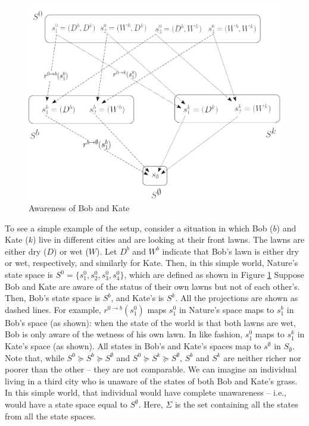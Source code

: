 \documentclass[
11pt,
titlepage,
reqno,
]{article}%
\theoremstyle{definition}
\begin{document}
	
\begin{figure}[h!]	
	\begin{center}
		\includegraphics[scale=.4]{lattice.png}
	\end{center}
\caption{Awareness of Bob and Kate\label{lattice}}
\end{figure}

	To see a simple example of the setup, consider a situation in which  Bob ($b$) and Kate ($k$) live in different cities and are looking at their front lawns. 
	The lawns are either dry ($D$) or wet ($W$).
	Let $D^b$ and $W^b$ indicate that Bob's lawn is either dry or wet, respectively, and similarly for Kate. 
	Then, in this simple world, Nature's state space is $S^0=\{s^0_1,s^0_2,s^0_3,s^0_4\}$, which are defined as shown in Figure \ref{lattice}
	Suppose Bob and Kate are aware of the status of their own lawns but not of each other's.
	Then, Bob's state space is $S^b$, and Kate's is $S^k$.
	All the projections are shown as dashed lines.
	For example,  $r^{0\rightarrow b}(s^0_1)$ maps $s^0_1$ in Nature's space maps to $s^b_1$ in Bob's space (as shown): when the state of the world is that both lawns are wet, Bob is only aware of the wetness of his own lawn.
	In like fashion, $s^0_1$ maps to $s^k_1$ in Kate's space (as shown).
	All states in Bob's and Kate's spaces map to $s^\emptyset$ in $S_\emptyset$.
	Note that, while $S^0\succeq S^b\succeq S^\emptyset$ and $S^0\succeq S^k\succeq S^\emptyset$, $S^b$ and $S^k$ are neither richer nor poorer than the other -- they are not comparable.
	We can imagine an individual living in a third city who is unaware of the states of both Bob and Kate's grass.
	In this simple world, that individual would have complete unawareness -- i.e., would have a state space equal to $S^\emptyset$.
	Here, $\Sigma$ is the set containing all the states from all the state spaces.
\end{document}

